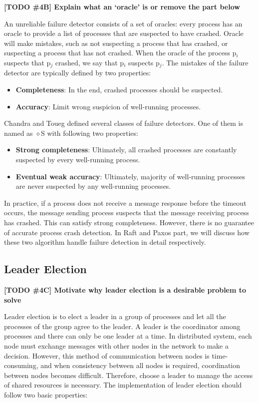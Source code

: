 \documentclass[12pt, a4paper]{article}
\newcommand{\todo}[2]{\textbf{\color{blue}[TODO \##1] #2}\par}
\begin{document}
\todo{4B}{Explain what an `oracle' is or remove the part below}

An unreliable failure detector consists of a set of oracles: every process has an oracle to provide a list of processes that are suspected to have crashed. Oracle will make mistakes, such as not suspecting a process that has crashed, or suspecting a process that has not crashed. When the oracle of the process p$_{i}$ suspects that p$_{j}$ crashed, we say that p$_{i}$ suspects p$_{j}$. The mistakes of the failure detector are typically defined by two properties:

\begin{itemize}
  \item \textbf{Completeness}: In the end, crashed processes should be
  suspected.
  \item \textbf{Accuracy}: Limit wrong suspicion of well-running processes.
\end{itemize}

Chandra and Toueg\cite{chandra1996unreliable} defined several classes of failure detectors. One of them is named as $\diamond$S with following two properties:

\begin{itemize}
  \item \textbf{Strong completeness}: Ultimately, all crashed processes are
  constantly suspected by every well-running process.
  \item \textbf{Eventual weak accuracy}: Ultimately, majority of well-running
  processes are never suspected by any well-running processes.
\end{itemize}

In practice, if a process does not receive a message response before the timeout occurs, the message sending process suspects that the message receiving process has crashed. This can satisfy strong completeness. However, there is no guarantee of accurate process crash detection. In Raft and Paxos part, we will discuss how these two algorithm handle failure detection in detail respectively.

\subsection{Leader Election}
\todo{4C}{Motivate why leader election is a desirable problem to solve}
Leader election is to elect a leader in a group of processes and let all the processes of the group agree to the leader. A leader is the coordinator among processes and there can only be one leader at a time. In distributed system, each node must exchange messages with other nodes in the network to make a decision. However, this method of communication between nodes is time-consuming, and when consistency between all nodes is required, coordination between nodes becomes difficult. Therefore, choose a leader to manage the access of shared resources is necessary. The implementation of leader election should follow two basic properties\cite{nugraheni2009formal}:
\end{document}
